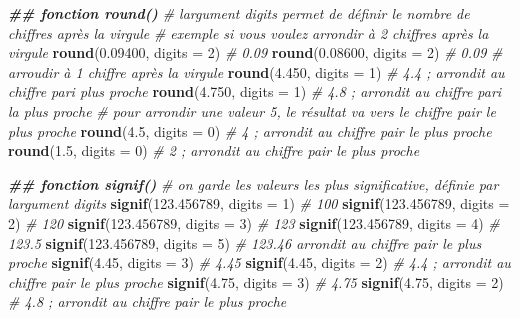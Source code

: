 \documentclass[
]{book}
\newenvironment{Shaded}{\begin{snugshade}}{\end{snugshade}}
\newcommand{\AttributeTok}[1]{\textcolor[rgb]{0.13,0.29,0.53}{#1}}
\newcommand{\CommentTok}[1]{\textcolor[rgb]{0.56,0.35,0.01}{\textit{#1}}}
\newcommand{\DecValTok}[1]{\textcolor[rgb]{0.00,0.00,0.81}{#1}}
\newcommand{\DocumentationTok}[1]{\textcolor[rgb]{0.56,0.35,0.01}{\textbf{\textit{#1}}}}
\newcommand{\FloatTok}[1]{\textcolor[rgb]{0.00,0.00,0.81}{#1}}
\newcommand{\FunctionTok}[1]{\textcolor[rgb]{0.13,0.29,0.53}{\textbf{#1}}}
\newcommand{\NormalTok}[1]{#1}
\begin{document}
\begin{Shaded}
\begin{Highlighting}[]
\DocumentationTok{\#\# fonction round()}
\CommentTok{\# l\textquotesingle{}argument digits permet de définir le nombre de chiffres après la virgule}
\CommentTok{\# exemple si vous voulez arrondir à 2 chiffres après la virgule}
\FunctionTok{round}\NormalTok{(}\FloatTok{0.09400}\NormalTok{, }\AttributeTok{digits =} \DecValTok{2}\NormalTok{) }\CommentTok{\# 0.09}
\FunctionTok{round}\NormalTok{(}\FloatTok{0.08600}\NormalTok{, }\AttributeTok{digits =} \DecValTok{2}\NormalTok{) }\CommentTok{\# 0.09}
\CommentTok{\# arroudir à 1 chiffre après la virgule}
\FunctionTok{round}\NormalTok{(}\FloatTok{4.450}\NormalTok{, }\AttributeTok{digits =} \DecValTok{1}\NormalTok{) }\CommentTok{\# 4.4 ; arrondit au chiffre pari plus proche}
\FunctionTok{round}\NormalTok{(}\FloatTok{4.750}\NormalTok{, }\AttributeTok{digits =} \DecValTok{1}\NormalTok{) }\CommentTok{\# 4.8 ; arrondit au chiffre pari la plus proche}
\CommentTok{\# pour arrondir une valeur 5, le résultat va vers le chiffre pair le plus proche}
\FunctionTok{round}\NormalTok{(}\FloatTok{4.5}\NormalTok{, }\AttributeTok{digits =} \DecValTok{0}\NormalTok{) }\CommentTok{\# 4 ; arrondit au chiffre pair le plus proche}
\FunctionTok{round}\NormalTok{(}\FloatTok{1.5}\NormalTok{, }\AttributeTok{digits =} \DecValTok{0}\NormalTok{) }\CommentTok{\# 2 ; arrondit au chiffre pair le plus proche}

\DocumentationTok{\#\# fonction signif()}
\CommentTok{\# on garde les valeurs les plus significative, définie par l\textquotesingle{}argument digits}
\FunctionTok{signif}\NormalTok{(}\FloatTok{123.456789}\NormalTok{, }\AttributeTok{digits =} \DecValTok{1}\NormalTok{) }\CommentTok{\# 100}
\FunctionTok{signif}\NormalTok{(}\FloatTok{123.456789}\NormalTok{, }\AttributeTok{digits =} \DecValTok{2}\NormalTok{) }\CommentTok{\# 120}
\FunctionTok{signif}\NormalTok{(}\FloatTok{123.456789}\NormalTok{, }\AttributeTok{digits =} \DecValTok{3}\NormalTok{) }\CommentTok{\# 123}
\FunctionTok{signif}\NormalTok{(}\FloatTok{123.456789}\NormalTok{, }\AttributeTok{digits =} \DecValTok{4}\NormalTok{) }\CommentTok{\# 123.5}
\FunctionTok{signif}\NormalTok{(}\FloatTok{123.456789}\NormalTok{, }\AttributeTok{digits =} \DecValTok{5}\NormalTok{) }\CommentTok{\# 123.46 arrondit au chiffre pair le plus proche }
\FunctionTok{signif}\NormalTok{(}\FloatTok{4.45}\NormalTok{, }\AttributeTok{digits =} \DecValTok{3}\NormalTok{) }\CommentTok{\# 4.45}
\FunctionTok{signif}\NormalTok{(}\FloatTok{4.45}\NormalTok{, }\AttributeTok{digits =} \DecValTok{2}\NormalTok{) }\CommentTok{\# 4.4 ; arrondit au chiffre pair le plus proche }
\FunctionTok{signif}\NormalTok{(}\FloatTok{4.75}\NormalTok{, }\AttributeTok{digits =} \DecValTok{3}\NormalTok{) }\CommentTok{\# 4.75}
\FunctionTok{signif}\NormalTok{(}\FloatTok{4.75}\NormalTok{, }\AttributeTok{digits =} \DecValTok{2}\NormalTok{) }\CommentTok{\# 4.8 ; arrondit au chiffre pair le plus proche }


\end{Highlighting}
\end{Shaded}
\end{document}
